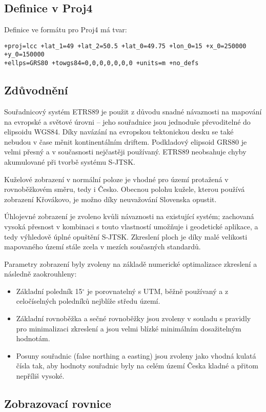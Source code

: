 \documentclass[a4paper]{article}
\newcommand{\dg}{^{\circ}}
\begin{document}
\subsection{Definice v Proj4}
Definice ve formátu pro Proj4 má tvar:
\begin{verbatim}
+proj=lcc +lat_1=49 +lat_2=50.5 +lat_0=49.75 +lon_0=15 +x_0=250000 +y_0=150000
+ellps=GRS80 +towgs84=0,0,0,0,0,0,0 +units=m +no_defs
\end{verbatim}

\subsection{Zdůvodnění}
Souřadnicový systém ETRS89 je použit z důvodu snadné návaznosti na mapování na evropské a světové úrovni -- jeho souřadnice jsou jednoduše převoditelné do elipsoidu WGS84. Díky navázání na evropskou tektonickou desku se také nebudou v čase měnit kontinentálním driftem. Podkladový elipsoid GRS80 je velmi přesný a v současnosti nejčastěji používaný. ETRS89 neobsahuje chyby akumulované při tvorbě systému S-JTSK.

Kuželové zobrazení v normální poloze je vhodné pro území protažená v rovnoběžkovém směru, tedy i Česko. Obecnou polohu kužele, kterou používá zobrazení Křovákovo, je možno díky neuvažování Slovenska opustit.

Úhlojevné zobrazení je zvoleno kvůli návaznosti na existující systém; zachovaná vysoká přesnost v kombinaci s touto vlastností umožňuje i geodetické aplikace, a tedy výhledově úplné opuštění S-JTSK. Zkreslení ploch je díky malé velikosti mapovaného území stále zcela v mezích současných standardů.

Parametry zobrazení byly zvoleny na základě numerické optimalizace zkreslení a následně zaokrouhleny:
\begin{itemize}
\item Základní poledník 15$\dg$ je porovnatelný s UTM, běžně používaný a z celočíselných poledníků nejblíže středu území.
\item Základní rovnoběžka a sečné rovnoběžky jsou zvoleny v souladu s pravidly pro minimalizaci zkreslení a jsou velmi blízké minimálním dosažitelným hodnotám.
\item Posuny souřadnic (false northing a easting) jsou zvoleny jako vhodná kulatá čísla tak, aby hodnoty souřadnic byly na celém území Česka kladné a přitom nepříliš vysoké.
\end{itemize}

\subsection{Zobrazovací rovnice}
\end{document}
